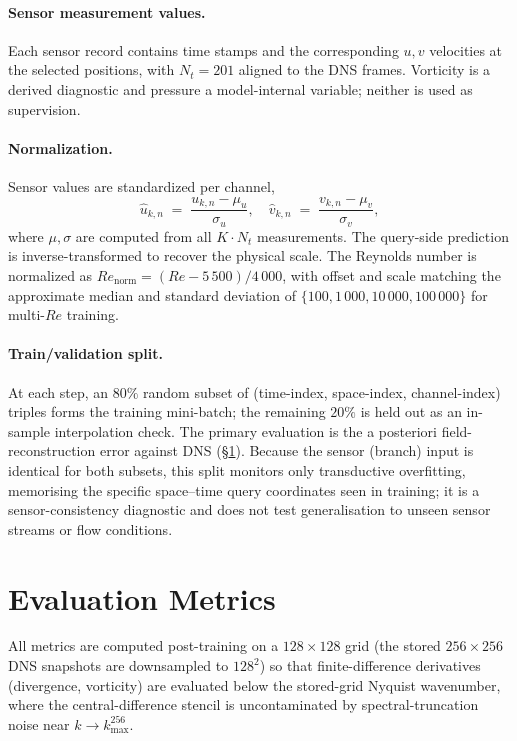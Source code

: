 \paragraph{Sensor measurement values.}
Each sensor record contains time stamps and the corresponding $u,v$ velocities at the selected positions, with $N_t = 201$ aligned to the DNS frames. Vorticity is a derived diagnostic and pressure a model-internal variable; neither is used as supervision.

\paragraph{Normalization.}
Sensor values are standardized per channel,
\begin{equation}
    \hat{u}_{k,n} \;=\; \frac{u_{k,n} - \mu_u}{\sigma_u},\quad \hat{v}_{k,n} \;=\; \frac{v_{k,n} - \mu_v}{\sigma_v},
\end{equation}
where $\mu, \sigma$ are computed from all $K\cdot N_t$ measurements. The query-side prediction is inverse-transformed to recover the physical scale. The Reynolds number is normalized as $Re_{\text{norm}} = (Re - 5\,500) / 4\,000$, with offset and scale matching the approximate median and standard deviation of $\{100, 1\,000, 10\,000, 100\,000\}$ for multi-$Re$ training.

\paragraph{Train/validation split.}
At each step, an $80\%$ random subset of (time-index, space-index, channel-index) triples forms the training mini-batch; the remaining $20\%$ is held out as an in-sample interpolation check. The primary evaluation is the a posteriori field-reconstruction error against DNS (\S\ref{sec:eval_metrics}). Because the sensor (branch) input is identical for both subsets, this split monitors only transductive overfitting, memorising the specific space--time query coordinates seen in training; it is a sensor-consistency diagnostic and does not test generalisation to unseen sensor streams or flow conditions.

\section{Evaluation Metrics}
\label{sec:eval_metrics}

All metrics are computed post-training on a $128\times 128$ grid (the stored $256\times 256$ DNS snapshots are downsampled to $128^2$) so that finite-difference derivatives (divergence, vorticity) are evaluated below the stored-grid Nyquist wavenumber, where the central-difference stencil is uncontaminated by spectral-truncation noise near $k\to k_{\max}^{256}$.

